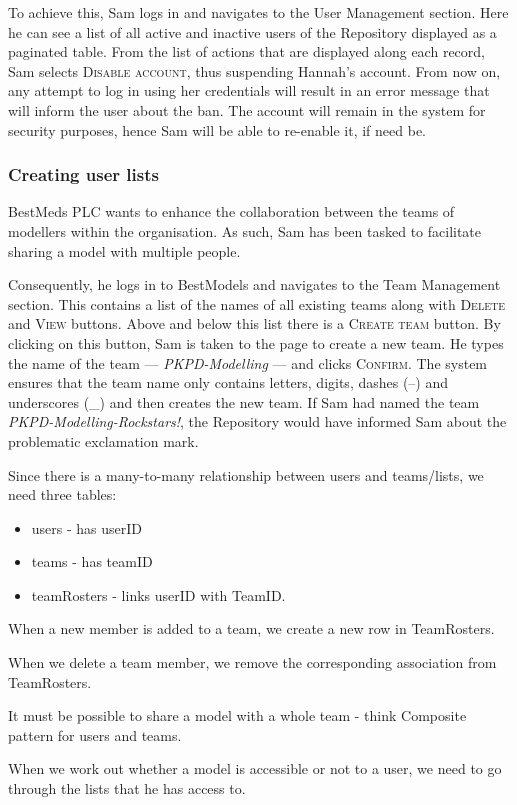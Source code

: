 To achieve this, Sam logs in and navigates to the User Management section. Here he can see a list of all active and inactive users of the Repository displayed as a paginated table. From the list of actions that are displayed along each record, Sam selects \textsc{Disable account}, thus suspending Hannah's account. From now on, any attempt to log in using her credentials will result in an error message that will inform the user about the ban. The account will remain in the system for security purposes, hence Sam will be able to re-enable it, if need be.

\subsubsection{Creating user lists}
BestMeds PLC  wants to enhance the collaboration between the teams of modellers within the organisation. As such, Sam has been tasked to facilitate sharing a model with multiple people.

Consequently, he logs in to BestModels and navigates to the Team Management section. This contains a list of the names of all existing teams along with \textsc{Delete} and \textsc{View} buttons. Above and below this list there is a \textsc{Create team} button. By clicking on this button, Sam is taken to the page to create a new team. He types the name of the team --- \emph{PKPD-Modelling} --- and clicks \textsc{Confirm}. The system ensures that the team name only contains letters, digits, dashes (--) and underscores (\_) and then creates the new team. If Sam had named the team \emph{PKPD-Modelling-Rockstars!}, the Repository would have informed Sam about the problematic exclamation mark.
\begin{techNote}
Since there is a many-to-many relationship between users and teams/lists, we need three tables: 
\begin{itemize}
\item users - has userID
\item teams - has teamID
\item teamRosters - links userID with TeamID. 
\end{itemize}

When a new member is added to a team, we create a new row in TeamRosters. 

When we delete a team member, we remove the corresponding association from TeamRosters.

It must be possible to share a model with a whole team - think Composite pattern for users and teams.

When we work out whether a model is accessible or not to a user, we need to go through the lists that he has access to.
\end{techNote}

